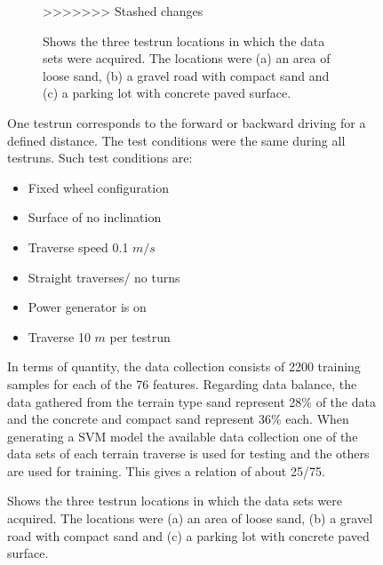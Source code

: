 \documentclass{article}
\begin{document}
\begin{figure}[!htb]
\begin{figure}[!htb]
  \centering
  \qquad
  \qquad
  \caption{Shows the three testrun locations in which the data sets were acquired. The locations were (a) an area of loose sand, (b) a gravel road with compact sand and (c) a parking lot with concrete paved surface. \label{fig:TestLocs}}%
>>>>>>> Stashed changes
\end{figure}

One testrun corresponds to the forward or backward driving for a defined distance. The test conditions were the same during all testruns. Such test conditions are:
\begin{itemize}
\item Fixed wheel configuration
\item Surface of no inclination
\item Traverse speed 0.1 $m/s$
\item Straight traverses/ no turns
\item Power generator is on
\item Traverse 10 $m$ per testrun
\end{itemize}

In terms of quantity, the data collection consists of 2200 training samples for each of the 76 features. Regarding data balance, the data gathered from the terrain type sand represent 28\% of the data and the concrete and compact sand represent 36\% each. 
When generating a SVM model the available data collection one of the data sets of each terrain traverse is used for testing and the others are used for training. This gives a relation of about 25/75.







\end{figure}
\end{document}
